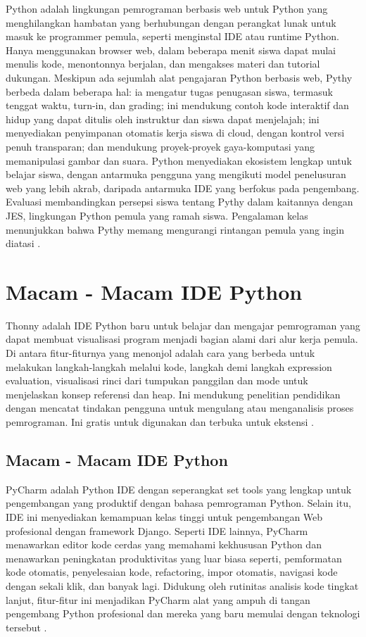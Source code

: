 	Python adalah lingkungan pemrograman berbasis web untuk Python yang menghilangkan hambatan yang berhubungan dengan perangkat lunak untuk masuk ke programmer pemula, seperti menginstal IDE atau runtime Python. Hanya menggunakan browser web, dalam beberapa menit siswa dapat mulai menulis kode, menontonnya berjalan, dan mengakses materi dan tutorial dukungan. Meskipun ada sejumlah alat pengajaran Python berbasis web, Pythy berbeda dalam beberapa hal: ia mengatur tugas penugasan siswa, termasuk tenggat waktu, turn-in, dan grading; ini mendukung contoh kode interaktif dan hidup yang dapat ditulis oleh instruktur dan siswa dapat menjelajah; ini menyediakan penyimpanan otomatis kerja siswa di cloud, dengan kontrol versi penuh transparan; dan mendukung proyek-proyek gaya-komputasi yang memanipulasi gambar dan suara. Python menyediakan ekosistem lengkap untuk belajar siswa, dengan antarmuka pengguna yang mengikuti model penelusuran web yang lebih akrab, daripada antarmuka IDE yang berfokus pada pengembang. Evaluasi membandingkan persepsi siswa tentang Pythy dalam kaitannya dengan JES, lingkungan Python pemula yang ramah siswa. Pengalaman kelas menunjukkan bahwa Pythy memang mengurangi rintangan pemula yang ingin diatasi \cite{edwards2014pythy}.\\

\section{Macam - Macam IDE Python}
Thonny adalah IDE Python baru untuk belajar dan mengajar pemrograman yang dapat membuat visualisasi program menjadi bagian alami dari alur kerja pemula.
Di antara fitur-fiturnya yang menonjol adalah cara yang berbeda untuk melakukan langkah-langkah melalui kode, langkah demi langkah expression evaluation, visualisasi rinci dari tumpukan panggilan dan mode untuk menjelaskan konsep referensi dan heap. Ini mendukung penelitian pendidikan dengan mencatat tindakan pengguna untuk mengulang atau menganalisis proses pemrograman. Ini gratis untuk digunakan dan terbuka untuk ekstensi \cite{annamaa2015introducing}.

\subsection{Macam - Macam IDE Python}
PyCharm adalah Python IDE dengan seperangkat set tools yang lengkap untuk pengembangan yang produktif dengan bahasa pemrograman Python. Selain itu, IDE ini menyediakan kemampuan kelas tinggi untuk pengembangan Web profesional dengan framework Django. Seperti IDE lainnya, PyCharm menawarkan editor kode cerdas yang memahami kekhususan Python dan menawarkan peningkatan produktivitas yang luar biasa seperti, pemformatan kode otomatis, penyelesaian kode, refactoring, impor otomatis, navigasi kode dengan sekali klik, dan banyak lagi. Didukung oleh rutinitas analisis kode tingkat lanjut, fitur-fitur ini menjadikan PyCharm alat yang ampuh di tangan pengembang Python profesional dan mereka yang baru memulai dengan teknologi tersebut \cite{fifli2016pirhoogammarhoalphamumualpha}.


